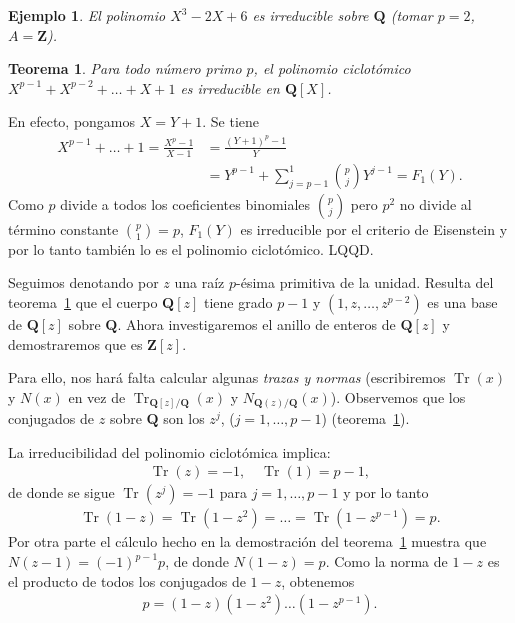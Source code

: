 \documentclass[bibtotoc,leqno,spanish]{amsbook}
\newcommand{\QQ}{\mathbf{Q}}
\newcommand{\ZZ}{\mathbf{Z}}
\newcommand{\QED}{LQQD.}
\DeclareMathOperator{\Tr}{Tr}
\numberwithin{equation}{section}
\theoremstyle{note}
\theoremstyle{note}
\newtheorem{theorem}{Teorema}
\theoremstyle{rem}
\newtheorem*{example*}{Ejemplo}
\numberwithin{theorem}{section}
\numberwithin{proposition}{section}
\numberwithin{definition}{section}
\numberwithin{lemma}{section}
\numberwithin{corollary}{section}
\numberwithin{example}{section}
\numberwithin{footnote}{section}%
\begin{document}
\begin{example*}
El polinomio $X^{3}-2X+6$ es irreducible sobre $\QQ$ (tomar $p=2$, $A=\ZZ$).
\end{example*}

\begin{theorem}\label{teo2.9.1}
Para todo n\'umero primo $p$, el polinomio ciclot\'omico $X^{p-1}+X^{p-2}+\dots+X+1$ es irreducible
en $\QQ[X]$.
\end{theorem}

En efecto, pongamos $X = Y+1$. Se tiene
\begin{align*}
X^{p-1}+\dots+1 = \frac{X^{p}-1}{X-1} &= \frac{(Y+1)^{p}-1}{Y}\\
&=Y^{p-1}+\sum_{j=p-1}^{1}\binom{p}{j}Y^{j-1}=F_{1}(Y).
\end{align*}
Como $p$ divide a todos los coeficientes binomiales $\binom{p}{j}$ pero $p^{2}$ no divide al
t\'ermino constante $\binom{p}{1} = p$, $F_{1}(Y)$ es irreducible por el criterio de Eisenstein y
por lo tanto tambi\'en lo es el polinomio ciclot\'omico. \QED

Seguimos denotando por $z$ una ra\'iz $p$-\'esima primitiva de la unidad. Resulta del
teorema~\ref{teo2.9.1} que el cuerpo
$\QQ[z]$ tiene grado $p-1$ y $(1,z,\dots,z^{p-2})$ es una base de  $\QQ[z]$ sobre $\QQ$. Ahora investigaremos el
anillo de enteros de $\QQ[z]$ y demostraremos que es $\ZZ[z]$.

Para ello, nos har\'a falta calcular algunas {\em trazas y normas} (escribiremos $\Tr(x)$ y $N(x)$ en vez
de $\Tr_{\QQ[z]/\QQ}(x)$ y $N_{\QQ(z)/\QQ}(x)$). Observemos que los conjugados de $z$ sobre $\QQ$ son los
$z^{j}$, ($j=1,\dots,p-1$) (teorema~\ref{teo2.9.1}).

La irreducibilidad del polinomio ciclot\'omica implica:
\begin{gather}\label{eq-2.9-1}
\Tr(z) = -1,\quad\Tr(1)=p-1,
\end{gather}
de donde se sigue $\Tr(z^{j}) = -1$ para $j=1,\dots,p-1$ y por lo tanto
\begin{gather}\label{eq-2.9-2}
\Tr(1-z) = \Tr(1-z^{2})=\dots=\Tr(1-z^{p-1}) = p.
\end{gather}
Por otra parte el c\'alculo hecho en la demostraci\'on del teorema~\ref{teo2.9.1} muestra que $N(z-1)=(-1)^{p-1}p$, de donde
$N(1-z)=p$. Como la norma de $1-z$ es el producto de todos los conjugados de $1-z$, obtenemos
\begin{gather}\label{eq-2.9-3}
p=(1-z)(1-z^{2})\dots(1-z^{p-1}).
\end{gather}
\end{document}
